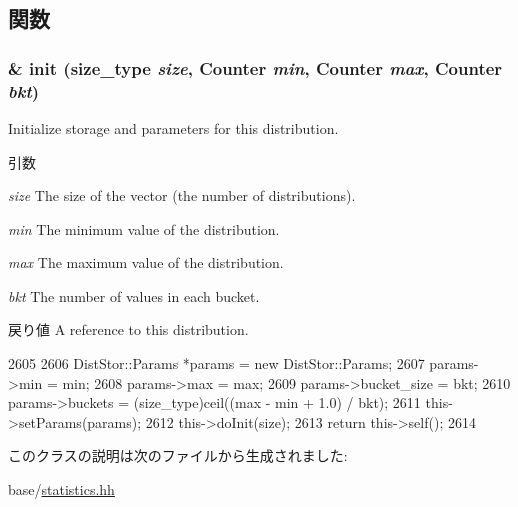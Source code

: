\subsection{関数}
\hypertarget{classStats_1_1VectorDistribution_ab5e2959f5d31e2ac926ba93fc0257cda}{
\subsubsection[{init}]{\& init ({\bf size\_\-type} {\em size}, \/  {\bf Counter} {\em min}, \/  {\bf Counter} {\em max}, \/  {\bf Counter} {\em bkt})}}
\label{classStats_1_1VectorDistribution_ab5e2959f5d31e2ac926ba93fc0257cda}
Initialize storage and parameters for this distribution. 
\begin{DoxyParams}{引数}
\item[{\em size}]The size of the vector (the number of distributions). \item[{\em min}]The minimum value of the distribution. \item[{\em max}]The maximum value of the distribution. \item[{\em bkt}]The number of values in each bucket. \end{DoxyParams}
\begin{DoxyReturn}{戻り値}
A reference to this distribution. 
\end{DoxyReturn}



\begin{DoxyCode}
2605     {
2606         DistStor::Params *params = new DistStor::Params;
2607         params->min = min;
2608         params->max = max;
2609         params->bucket_size = bkt;
2610         params->buckets = (size_type)ceil((max - min + 1.0) / bkt);
2611         this->setParams(params);
2612         this->doInit(size);
2613         return this->self();
2614     }
\end{DoxyCode}


このクラスの説明は次のファイルから生成されました:\begin{DoxyCompactItemize}
\item 
base/\hyperlink{statistics_8hh}{statistics.hh}\end{DoxyCompactItemize}
